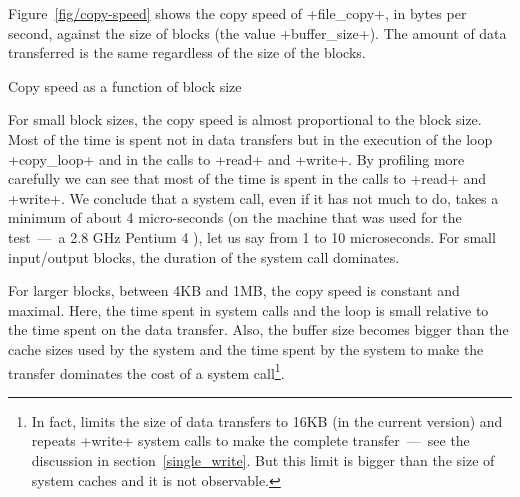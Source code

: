 Figure~\ref{fig/copy-speed} shows the copy speed of \ml+file_copy+, in
bytes per second, against the size of blocks (the value
\ml+buffer_size+). The amount of data transferred is the same
regardless of the size of the blocks.
\begin{myfigure}
\begin{myimage}[width="100\%"]
\end{myimage}
\caption{Copy speed as a function of block size}
\label{fig/copy-speed}
\end{myfigure}
For small block sizes, the copy speed is almost proportional to the
block size. Most of the time is spent not in data transfers but in the
execution of the loop \ml+copy_loop+ and in the calls to \ml+read+ and
\ml+write+. By profiling more carefully we can see that most of the
time is spent in the calls to \ml+read+ and \ml+write+. We conclude
that a system call, even if it has not much to do, takes a minimum of
about 4 micro-seconds (on the machine that was used for the test~---~a
2.8 GHz Pentium 4 ), let us say from 1 to 10 microseconds.  For small
input/output blocks, the duration of the system call dominates.
  
For larger blocks, between 4KB and 1MB, the copy speed is constant and
maximal. Here, the time spent in system calls and the loop is small
relative to the time spent on the data transfer. Also, the buffer
size becomes bigger than the cache sizes used by the system and the
time spent by the system to make the transfer dominates the cost of a
system call\footnote{In fact, {\ocaml} limits the size of data
  transfers to 16KB (in the current version) and repeats \ml+write+
  system calls to make the complete transfer~---~see the discussion in
  section~\ref{single_write}. But this limit is bigger than the
  size of system caches and it is not observable.}.

